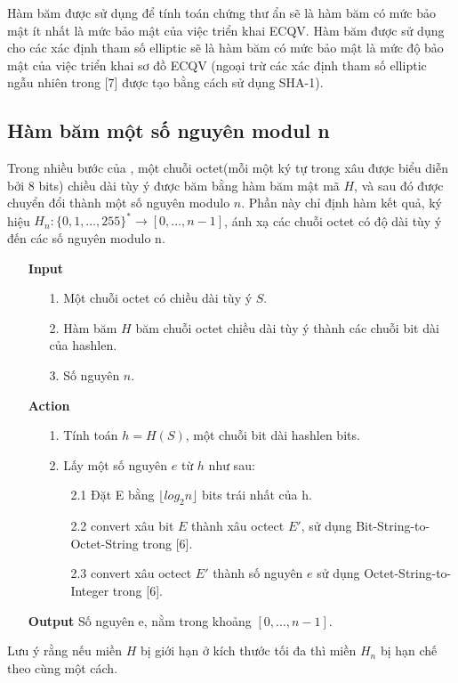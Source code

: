 \documentclass[a4paper,12pt]{report}
\begin{document}
Hàm băm được sử dụng để tính toán chứng thư ẩn sẽ là hàm băm có mức bảo mật ít nhất là mức bảo mật của việc triển khai ECQV. Hàm băm được sử dụng cho các xác định tham số  elliptic sẽ là hàm băm có mức bảo mật là mức độ bảo mật của việc triển khai sơ đồ ECQV (ngoại trừ các xác định tham số elliptic ngẫu nhiên trong [7] được tạo bằng cách sử dụng SHA-1).
\subsection*{Hàm băm một số nguyên modul n}
Trong nhiều bước của , một chuỗi octet(mỗi một ký tự trong xâu được biểu diễn bởi 8 bits) chiều dài tùy ý được băm bằng hàm băm mật mã $H$, và sau đó được chuyển đổi thành một số nguyên modulo $n$. Phần này chỉ định hàm kết quả, ký hiệu $H_n: \{0, 1,\ldots , 255\}^{*} \rightarrow [0,\ldots , n - 1]$, ánh xạ các chuỗi octet có độ dài tùy ý đến các số nguyên modulo n.
\begin{itemize}
\item[] \textbf{Input}
\begin{itemize}
\item[1. ] Một chuỗi octet có chiều dài tùy ý $S$.
\item[2. ] Hàm băm $H$ băm chuỗi octet chiều dài tùy ý thành các chuỗi bit dài của hashlen.
\item[3. ] Số nguyên $n$.
\end{itemize}
\item[] \textbf{Action}
\begin{itemize}
\item[1. ] Tính toán $h = H(S)$, một chuỗi bit dài hashlen bits.
\item[2. ] Lấy một số nguyên $e$ từ $h$ như sau:
\begin{itemize}
\item[2.1 ] Đặt E bằng $\lfloor log_2{n} \rfloor$ bits trái nhất của h.
\item[2.2 ] convert xâu bit $E$ thành xâu octect $E'$, sử dụng  Bit-String-to-Octet-String trong [6].
\item[2.3 ] convert xâu octect $E'$ thành số nguyên $e$ sử dụng Octet-String-to-Integer trong [6].
\end{itemize}
\end{itemize}
\item[] \textbf{Output} Số nguyên e, nằm trong khoảng $[0,\ldots , n - 1]$.
\end{itemize}
Lưu ý rằng nếu miền $H$ bị giới hạn ở kích thước tối đa thì miền $H_n$ bị hạn chế theo cùng một cách. 
\end{document}
